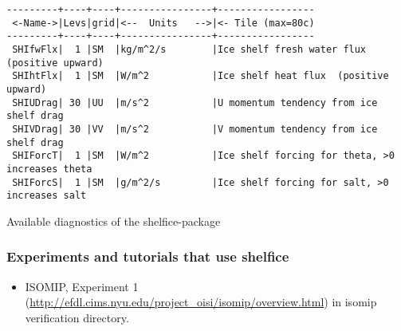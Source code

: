 \begin{table}[!ht]
\centering
\label{tab:pkg:shelfice:diagnostics}
{\footnotesize
\begin{verbatim}
---------+----+----+----------------+-----------------
 <-Name->|Levs|grid|<--  Units   -->|<- Tile (max=80c)
---------+----+----+----------------+-----------------
 SHIfwFlx|  1 |SM  |kg/m^2/s        |Ice shelf fresh water flux (positive upward)
 SHIhtFlx|  1 |SM  |W/m^2           |Ice shelf heat flux  (positive upward)
 SHIUDrag| 30 |UU  |m/s^2           |U momentum tendency from ice shelf drag
 SHIVDrag| 30 |VV  |m/s^2           |V momentum tendency from ice shelf drag
 SHIForcT|  1 |SM  |W/m^2           |Ice shelf forcing for theta, >0 increases theta
 SHIForcS|  1 |SM  |g/m^2/s         |Ice shelf forcing for salt, >0 increases salt
\end{verbatim}
}
\caption{Available diagnostics of the shelfice-package}
\end{table}



\subsubsection{Experiments and tutorials that use shelfice}
\label{sec:pkg:shelfice:experiments}

\begin{itemize}
\item{ISOMIP, Experiment 1
    (\url{http://efdl.cims.nyu.edu/project_oisi/isomip/overview.html})
    in isomip verification directory.}
\end{itemize}


